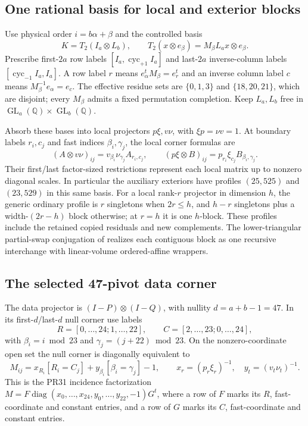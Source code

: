 \subsection{One rational basis for local and exterior blocks}
Use physical order $i=b\alpha+\beta$ and the controlled basis
\[
 K=T_2(I_a\otimes L_b),\qquad
 T_2(x\otimes e_\beta)=M_\beta L_ax\otimes e_\beta.
\]
Prescribe first-$2a$ row labels $[I_a,\operatorname{cyc}_{+1}I_a]$
and last-$2a$ inverse-column labels
$[\operatorname{cyc}_{-1}I_a,I_a]$.
A row label $r$ means $e_\alpha^tM_\beta=e_r^t$ and an inverse
column label $c$ means $M_\beta^{-1}e_\alpha=e_c$.
The effective residue sets are $\{0,1,3\}$ and $\{18,20,21\}$,
which are disjoint; every $M_\beta$ admits a fixed permutation
completion. Keep $L_a,L_b$ free in
$\operatorname{GL}_a(\mathbb Q)\times\operatorname{GL}_b(\mathbb Q)$.

Absorb these bases into local projectors $p\xi,v\nu$, with
$\xi p=\nu v=1$. At boundary labels $r_i,c_j$ and fast indices
$\beta_i,\gamma_j$, the local corner formulas are
\[
 (A\otimes v\nu)_{ij}=v_{\beta_i}\nu_{\gamma_j}A_{r_i,c_j},\qquad
 (p\xi\otimes B)_{ij}=p_{r_i}\xi_{c_j}B_{\beta_i,\gamma_j}.
\]
Their first/last factor-sized restrictions represent each local matrix
up to nonzero diagonal scales. In particular the auxiliary exteriors
have profiles $(25,525)$ and $(23,529)$ in this same basis.
For a local rank-$r$ projector in dimension $h$, the generic ordinary
profile is $r$ singletons when $2r\le h$, and $h-r$ singletons plus
a width-$(2r-h)$ block otherwise; at $r=h$ it is one $h$-block.
These profiles include the retained copied residuals and new complements.
The lower-triangular partial-swap conjugation of
 realizes each contiguous block as
one recursive interchange with linear-volume ordered-affine wrappers.

\subsection{The selected 47-pivot data corner}
The data projector is $(I-P)\otimes(I-Q)$, with nullity
$d=a+b-1=47$. In its first-$d$/last-$d$ null corner use labels
\[
 R=[0,\ldots,24;1,\ldots,22],\qquad
 C=[2,\ldots,23;0,\ldots,24],
\]
with $\beta_i=i\bmod23$ and $\gamma_j=(j+22)\bmod23$.
On the nonzero-coordinate open set the null corner is diagonally
equivalent to
\[
 M_{ij}=x_{R_i}[R_i=C_j]+y_{\beta_i}[\beta_i=\gamma_j]-1,
 \qquad x_r=(p_r\xi_r)^{-1},\quad y_t=(v_t\nu_t)^{-1}.
\]
This is the PR31 incidence factorization
$M=F\operatorname{diag}(x_0,\ldots,x_{24},y_0,\ldots,y_{22},-1)G^t$,
where a row of $F$ marks its $R$, fast-coordinate and constant entries,
and a row of $G$ marks its $C$, fast-coordinate and constant entries.


